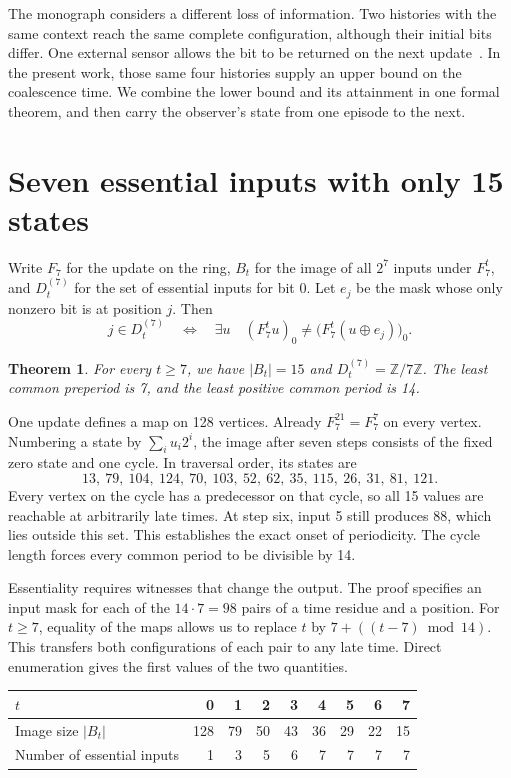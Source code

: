 \documentclass[11pt,a4paper]{article}
\theoremstyle{compact}
\newtheorem{theorem}{Theorem}
\newcommand{\Z}{\mathbb Z}
\begin{document}
The monograph considers a different loss of information. Two histories with
the same context reach the same complete configuration, although their initial
bits differ. One external sensor allows the bit to be returned on the next
update~\cite{observer}. In the present work, those same four histories supply an
upper bound on the coalescence time. We combine the lower bound and its
attainment in one formal theorem, and then carry the observer's state from one
episode to the next.

\section{Seven essential inputs with only 15 states}

Write $F_7$ for the update on the ring, $B_t$ for the image of all $2^7$ inputs
under $F_7^t$, and $D_t^{(7)}$ for the set of essential inputs for bit 0. Let $e_j$
be the mask whose only nonzero bit is at position $j$. Then
\[
 j\in D_t^{(7)}\quad\Longleftrightarrow\quad
 \exists u\quad (F_7^tu)_0\ne\bigl(F_7^t(u\oplus e_j)\bigr)_0.
\]

\begin{theorem}\label{thm:ring}
For every $t\ge7$, we have $|B_t|=15$ and $D_t^{(7)}=\Z/7\Z$.
The least common preperiod is 7, and the least positive common period is 14.
\end{theorem}

One update defines a map on 128 vertices. Already $F_7^{21}=F_7^7$ on every
vertex. Numbering a state by $\sum_i u_i2^i$, the image after seven steps consists
of the fixed zero state and one cycle. In traversal order, its states are
\[
13,\ 79,\ 104,\ 124,\ 70,\ 103,\ 52,\ 62,\ 35,\ 115,\ 26,\ 31,\ 81,\ 121.
\]
Every vertex on the cycle has a predecessor on that cycle, so all 15 values are
reachable at arbitrarily late times. At step six, input 5 still produces 88,
which lies outside this set. This establishes the exact onset of periodicity.
The cycle length forces every common period to be divisible by 14.

Essentiality requires witnesses that change the output. The proof specifies an
input mask for each of the $14\cdot7=98$ pairs of a time residue and a position.
For $t\ge7$, equality of the maps allows us to replace $t$ by
$7+((t-7)\bmod14)$. This transfers both configurations of each pair to any late
time. Direct enumeration gives the first values of the two quantities.

\begin{center}
\small
\begin{tabular}{@{}lrrrrrrrr@{}}
\toprule
$t$ & 0 & 1 & 2 & 3 & 4 & 5 & 6 & 7\\
\midrule
Image size $|B_t|$ & 128 & 79 & 50 & 43 & 36 & 29 & 22 & 15\\
Number of essential inputs & 1 & 3 & 5 & 6 & 7 & 7 & 7 & 7\\
\bottomrule
\end{tabular}
\end{center}
\end{document}

